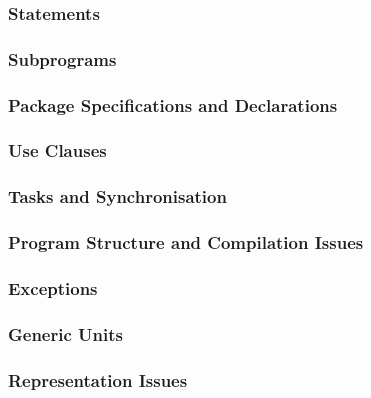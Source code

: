 \documentclass{article}
\begin{document}
\subsubsection{Statements}

\subsubsection{Subprograms}

\subsubsection{Package Specifications and Declarations}

\subsubsection{Use Clauses}

\subsubsection{Tasks and Synchronisation}

\subsubsection{Program Structure and Compilation Issues}

\subsubsection{Exceptions}

\subsubsection{Generic Units}

\subsubsection{Representation Issues}
\end{document}
